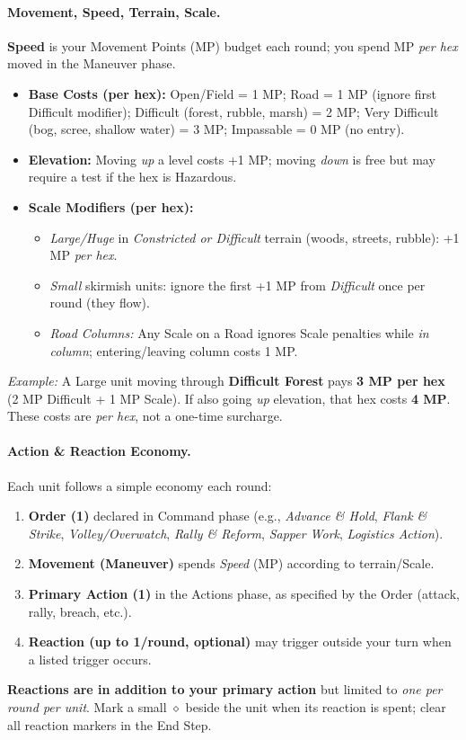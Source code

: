 \documentclass[11pt]{article}
\begin{document}
\paragraph{Movement, Speed, Terrain, Scale.}
\textbf{Speed} is your Movement Points (MP) budget each round; you spend MP \emph{per hex} moved in the Maneuver phase.
\begin{itemize}[leftmargin=*]
  \item \textbf{Base Costs (per hex):} Open/Field = 1 MP; Road = 1 MP (ignore first Difficult modifier); Difficult (forest, rubble, marsh) = 2 MP; Very Difficult (bog, scree, shallow water) = 3 MP; Impassable = 0 MP (no entry).
  \item \textbf{Elevation:} Moving \emph{up} a level costs +1 MP; moving \emph{down} is free but may require a test if the hex is Hazardous.
  \item \textbf{Scale Modifiers (per hex):}
    \begin{itemize}
      \item \emph{Large/Huge} in \textit{Constricted or Difficult} terrain (woods, streets, rubble): +1 MP \emph{per hex}.
      \item \emph{Small} skirmish units: ignore the first +1 MP from \textit{Difficult} once per round (they flow).
      \item \emph{Road Columns:} Any Scale on a Road ignores Scale penalties while \emph{in column}; entering/leaving column costs 1 MP.
    \end{itemize}
\end{itemize}
\textit{Example:} A Large unit moving through \textbf{Difficult Forest} pays \textbf{3 MP per hex} (2 MP Difficult + 1 MP Scale). If also going \emph{up} elevation, that hex costs \textbf{4 MP}. These costs are \emph{per hex}, not a one-time surcharge.

\paragraph{Action \& Reaction Economy.}
Each unit follows a simple economy each round:
\begin{enumerate}[leftmargin=*]
  \item \textbf{Order (1)} declared in Command phase (e.g., \textit{Advance \& Hold}, \textit{Flank \& Strike}, \textit{Volley/Overwatch}, \textit{Rally \& Reform}, \textit{Sapper Work}, \textit{Logistics Action}).
  \item \textbf{Movement (Maneuver)} spends \emph{Speed} (MP) according to terrain/Scale.
  \item \textbf{Primary Action (1)} in the Actions phase, as specified by the Order (attack, rally, breach, etc.).
  \item \textbf{Reaction (up to 1/round, optional)} may trigger outside your turn when a listed trigger occurs.
\end{enumerate}
\textbf{Reactions are in addition to your primary action} but limited to \emph{one per round per unit}. Mark a small $\diamond$ beside the unit when its reaction is spent; clear all reaction markers in the End Step.
\end{document}
